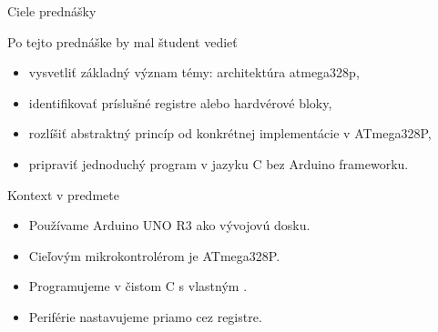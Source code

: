 
\begin{frame}{Ciele prednášky}
\begin{tukebox}{Po tejto prednáške by mal študent vedieť}
\begin{itemize}
    \item vysvetliť základný význam témy: architektúra atmega328p,
    \item identifikovať príslušné registre alebo hardvérové bloky,
    \item rozlíšiť abstraktný princíp od konkrétnej implementácie v ATmega328P,
    \item pripraviť jednoduchý program v jazyku C bez Arduino frameworku.
\end{itemize}
\end{tukebox}
\end{frame}

\begin{frame}{Kontext v predmete}
\begin{itemize}
    \item Používame Arduino UNO R3 ako vývojovú dosku.
    \item Cieľovým mikrokontrolérom je ATmega328P.
    \item Programujeme v čistom C s vlastným .
    \item Periférie nastavujeme priamo cez registre.
\end{itemize}
\end{frame}
